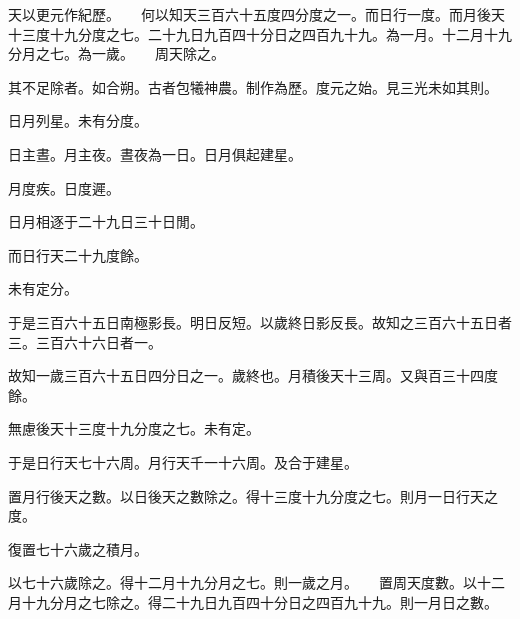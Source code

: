 \documentclass[a4paper,12pt,UTF8,twoside]{ctexbook}
\begin{document}
天以更元作紀歷。　　何以知天三百六十五度四分度之一。而日行一度。而月後天十三度十九分度之七。二十九日九百四十分日之四百九十九。為一月。十二月十九分月之七。為一歲。　　周天除之。

其不足除者。如合朔。古者包犧神農。制作為歷。度元之始。見三光未如其則。

日月列星。未有分度。

日主晝。月主夜。晝夜為一日。日月俱起建星。

月度疾。日度遲。

日月相逐于二十九日三十日閒。

而日行天二十九度餘。

未有定分。

于是三百六十五日南極影長。明日反短。以歲終日影反長。故知之三百六十五日者三。三百六十六日者一。

故知一歲三百六十五日四分日之一。歲終也。月積後天十三周。又與百三十四度餘。

無慮後天十三度十九分度之七。未有定。

于是日行天七十六周。月行天千一十六周。及合于建星。

置月行後天之數。以日後天之數除之。得十三度十九分度之七。則月一日行天之度。

復置七十六歲之積月。

以七十六歲除之。得十二月十九分月之七。則一歲之月。　　置周天度數。以十二月十九分月之七除之。得二十九日九百四十分日之四百九十九。則一月日之數。 


\backmatter
\end{document}
